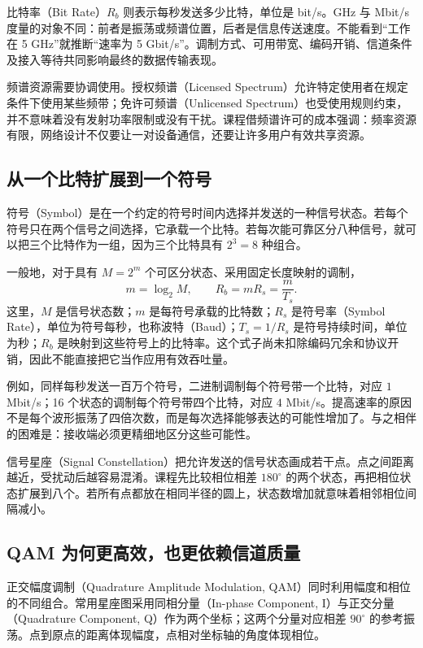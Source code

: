 比特率（Bit Rate）$R_b$ 则表示每秒发送多少比特，单位是 bit/s。GHz 与 Mbit/s 度量的对象不同：前者是振荡或频谱位置，后者是信息传送速度。不能看到“工作在 5 GHz”就推断“速率为 5 Gbit/s”。调制方式、可用带宽、编码开销、信道条件及接入等待共同影响最终的数据传输表现。

频谱资源需要协调使用。授权频谱（Licensed Spectrum）允许特定使用者在规定条件下使用某些频带；免许可频谱（Unlicensed Spectrum）也受使用规则约束，并不意味着没有发射功率限制或没有干扰。课程借频谱许可的成本强调：频率资源有限，网络设计不仅要让一对设备通信，还要让许多用户有效共享资源。

\subsection{从一个比特扩展到一个符号}
符号（Symbol）是在一个约定的符号时间内选择并发送的一种信号状态。若每个符号只在两个信号之间选择，它承载一个比特。若每次能可靠区分八种信号，就可以把三个比特作为一组，因为三个比特具有 $2^3=8$ 种组合。

一般地，对于具有 $M=2^m$ 个可区分状态、采用固定长度映射的调制，
\begin{equation}
m=\log_2 M,\qquad R_b=mR_s=\frac{m}{T_s}.
\end{equation}
这里，$M$ 是信号状态数；$m$ 是每符号承载的比特数；$R_s$ 是符号率（Symbol Rate），单位为符号每秒，也称波特（Baud）；$T_s=1/R_s$ 是符号持续时间，单位为秒；$R_b$ 是映射到这些符号上的比特率。这个式子尚未扣除编码冗余和协议开销，因此不能直接把它当作应用有效吞吐量。

例如，同样每秒发送一百万个符号，二进制调制每个符号带一个比特，对应 $1$ Mbit/s；16 个状态的调制每个符号带四个比特，对应 $4$ Mbit/s。提高速率的原因不是每个波形振荡了四倍次数，而是每次选择能够表达的可能性增加了。与之相伴的困难是：接收端必须更精细地区分这些可能性。

信号星座（Signal Constellation）把允许发送的信号状态画成若干点。点之间距离越近，受扰动后越容易混淆。课程先比较相位相差 $180^\circ$ 的两个状态，再把相位状态扩展到八个。若所有点都放在相同半径的圆上，状态数增加就意味着相邻相位间隔减小。

\subsection{QAM 为何更高效，也更依赖信道质量}
正交幅度调制（Quadrature Amplitude Modulation, QAM）同时利用幅度和相位的不同组合。常用星座图采用同相分量（In-phase Component, I）与正交分量（Quadrature Component, Q）作为两个坐标；这两个分量对应相差 $90^\circ$ 的参考振荡。点到原点的距离体现幅度，点相对坐标轴的角度体现相位。

